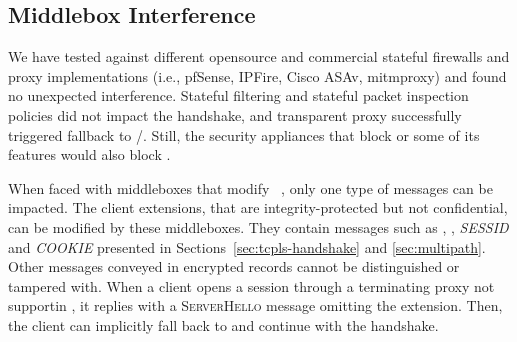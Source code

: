 



\subsection{Middlebox Interference}
\label{sec:middlebox}

We have tested \tcpls against different opensource and commercial 
stateful
firewalls and proxy implementations (i.e., pfSense, IPFire, Cisco ASAv,
mitmproxy) and found no unexpected interference. Stateful filtering and stateful
packet inspection policies did not impact the \tcpls handshake, and transparent 
\tls
proxy successfully triggered \tcpls fallback to \tls/\tcp. Still, the security
appliances that block  or some of its features
\cite{lee2019matls,Bock_China,raman2020measuring} would also block \tcpls.

When faced with middleboxes that modify ~\cite{Bock_China,raman2020measuring}, only one type of \tcpls 
messages can be impacted. The client \tls extensions, that are 
integrity-protected but not confidential, can be modified by these middleboxes. 
They contain messages such as \hello, \join, \textit{SESSID} and 
\textit{COOKIE} presented 
in Sections~\ref{sec:tcpls-handshake} and \ref{sec:multipath}. Other messages 
conveyed in encrypted \tls records cannot be distinguished or tampered with.
When a client opens a \tcpls session
through a \tls terminating proxy not supportin \tcpls, it replies 
with 
a \textsc{ServerHello} message omitting the \hello extension. Then, the client 
can implicitly fall back to \tls and continue with the handshake.

